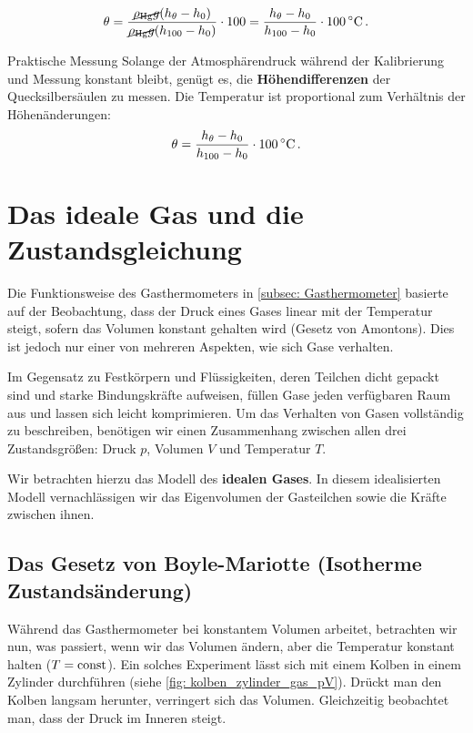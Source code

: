 \begin{equation}
    \theta = \frac{\cancel{\rho_{\text{Hg}} g} (h_\theta - h_0)}{\cancel{\rho_{\text{Hg}} g} (h_{100} - h_0)} \cdot 100 
    = \frac{h_\theta - h_0}{h_{100} - h_0} \cdot \SI{100}{\celsius} \,.
\end{equation}

\begin{importantbox}{Praktische Messung}
    Solange der Atmosphärendruck während der Kalibrierung und Messung konstant bleibt, genügt es, die \textbf{Höhendifferenzen} der Quecksilbersäulen zu messen. Die Temperatur ist proportional zum Verhältnis der Höhenänderungen:
    \begin{equation}
        \theta = \frac{h_\theta - h_0}{h_{100} - h_0} \cdot \SI{100}{\celsius} \,.
    \end{equation}
\end{importantbox}


\section{Das ideale Gas und die Zustandsgleichung}\label{sec: ideales_gas}
Die Funktionsweise des Gasthermometers in \cref{subsec: Gasthermometer} basierte auf der Beobachtung, dass der Druck eines Gases linear mit der Temperatur steigt, sofern das Volumen konstant gehalten wird (Gesetz von Amontons). Dies ist jedoch nur einer von mehreren Aspekten, wie sich Gase verhalten.

Im Gegensatz zu Festkörpern und Flüssigkeiten, deren Teilchen dicht gepackt sind und starke Bindungskräfte aufweisen, füllen Gase jeden verfügbaren Raum aus und lassen sich leicht komprimieren. Um das Verhalten von Gasen vollständig zu beschreiben, benötigen wir einen Zusammenhang zwischen allen drei Zustandsgrößen: Druck $p$, Volumen $V$ und Temperatur $T$.

Wir betrachten hierzu das Modell des \textbf{idealen Gases}. In diesem idealisierten Modell vernachlässigen wir das Eigenvolumen der Gasteilchen sowie die Kräfte zwischen ihnen.

\subsection{Das Gesetz von Boyle-Mariotte (Isotherme Zustandsänderung)}\label{subsec: boyle_mariotte}
Während das Gasthermometer bei konstantem Volumen arbeitet, betrachten wir nun, was passiert, wenn wir das Volumen ändern, aber die Temperatur konstant halten ($T = \mathrm{const}$).
Ein solches Experiment lässt sich mit einem Kolben in einem Zylinder durchführen (siehe \cref{fig: kolben_zylinder_gas_pV}). Drückt man den Kolben langsam herunter, verringert sich das Volumen. Gleichzeitig beobachtet man, dass der Druck im Inneren steigt.

